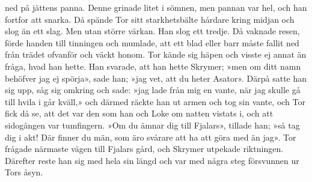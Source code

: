 ned på jättens panna. Denne grinade litet i sömnen, men pannan var hel,
och
han fortfor att snarka. Då spände Tor sitt starkhetsbälte hårdare kring
midjan och slog än ett slag. Men utan större värkan. Han slog ett
tredje. Då vaknade resen, förde handen till tinningen och mumlade, att
ett blad eller barr måste fallit ned från trädet ofvanför och väckt
honom. Tor kände sig häpen och visste ej annat än fråga, hvad han hette.
Han svarade, att han hette Skrymer; »men om ditt namn behöfver jag ej
spörja», sade han; »jag vet, att du heter Asator». Därpå satte han sig
upp, såg sig omkring och sade: »jag lade från mig en vante, när jag
skulle gå till hvila i går kväll,» och därmed räckte han ut armen och
tog sin vante, och Tor fick då se, att det var den som han och Loke om
natten vistats i, och att sidogången var tumfingern. »Om du ämnar dig
till Fjalars», tillade han; »så tag dig i akt! Där finner du män, som
äro svårare att ha att göra med än jag». Tor frågade närmaste vägen till
Fjalars gård, och Skrymer utpekade riktningen. Därefter reste han sig
med hela sin längd och var med några steg försvunnen ur Tors åsyn.

